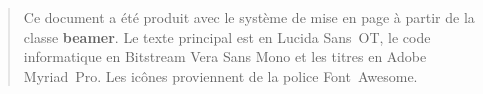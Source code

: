 \begin{frame}[plain]
  \scriptsize %
  \vfill
  \begin{quote}
    Ce document a été produit avec le système de mise en page
    {\XeLaTeX} à partir de la classe \textbf{beamer}. Le texte
    principal est en Lucida Sans~OT, le code informatique en Bitstream
    Vera Sans Mono et les titres en Adobe Myriad~Pro. Les icônes
    proviennent de la police Font~Awesome.
  \end{quote}
  \vfill
\end{frame}


